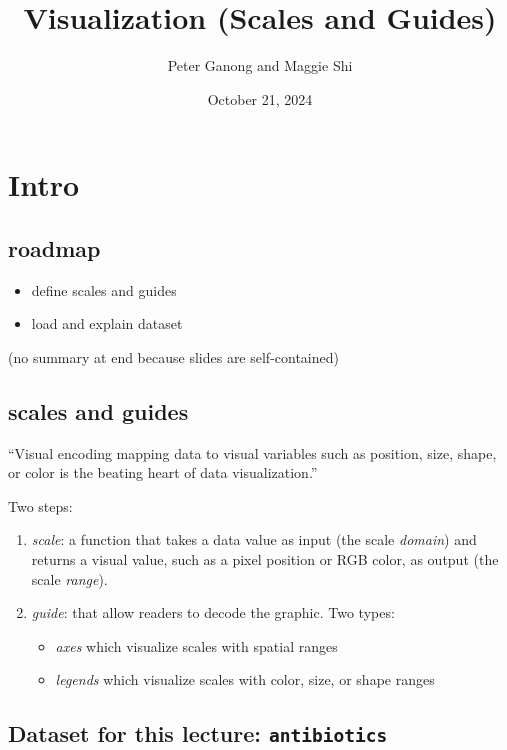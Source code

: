 \documentclass[
  letterpaper,
  DIV=11,
  numbers=noendperiod]{scrartcl}
\title{Visualization (Scales and Guides)}
\author{Peter Ganong and Maggie Shi}
\date{October 21, 2024}
\providecommand{\tightlist}{%
  \setlength{\itemsep}{0pt}\setlength{\parskip}{0pt}}\usepackage{longtable,booktabs,array}
\begin{document}
\maketitle


\section{Intro}\label{intro}

\subsection{roadmap}\label{roadmap}

\begin{itemize}
\tightlist
\item
  define scales and guides
\item
  load and explain dataset
\end{itemize}

(no summary at end because slides are self-contained)

\subsection{scales and guides}\label{scales-and-guides}

``Visual encoding mapping data to visual variables such as position,
size, shape, or color is the beating heart of data visualization.''

Two steps:

\begin{enumerate}
\def\labelenumi{\arabic{enumi}.}
\tightlist
\item
  \emph{scale}: a function that takes a data value as input (the scale
  \emph{domain}) and returns a visual value, such as a pixel position or
  RGB color, as output (the scale \emph{range}).
\item
  \emph{guide}: that allow readers to decode the graphic. Two types:

  \begin{itemize}
  \tightlist
  \item
    \emph{axes} which visualize scales with spatial ranges
  \item
    \emph{legends} which visualize scales with color, size, or shape
    ranges
  \end{itemize}
\end{enumerate}

\subsection{\texorpdfstring{Dataset for this lecture:
\texttt{antibiotics}}{Dataset for this lecture: antibiotics}}\label{dataset-for-this-lecture-antibiotics}
\end{document}

